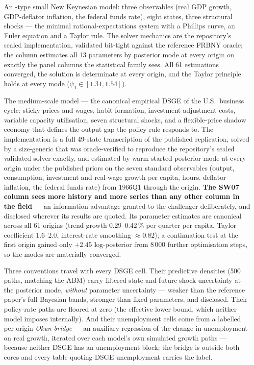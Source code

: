 \documentclass[11pt,a4paper]{article}
\newcommand{\code}[1]{\texttt{\detokenize{#1}}}
\begin{document}
\begin{description}[leftmargin=1.4em,style=nextline,itemsep=3pt]
\item[\code{dsge_small_nk}.] An \citet{anschorfheide2007}-type small New Keynesian model: three
  observables (real GDP growth, GDP-deflator inflation, the federal funds rate), eight states,
  three structural shocks --- the minimal rational-expectations system with a Phillips curve, an
  Euler equation and a Taylor rule. The solver mechanics are the repository's sealed
  implementation, validated bit-tight against the reference FRBNY \code{DSGE.jl} oracle; the
  column estimates all 13 parameters by posterior mode at every origin on exactly the panel
  columns the statistical family sees. All 61 estimations converged, the solution is determinate
  at every origin, and the Taylor principle holds at every mode ($\psi_1 \in [1.31, 1.54]$).
\item[\code{dsge_sw07}.] The \citet{smetswouters2007} medium-scale model --- the canonical
  empirical DSGE of the U.S.\ business cycle: sticky prices and wages, habit formation,
  investment adjustment costs, variable capacity utilisation, seven structural shocks, and a
  flexible-price shadow economy that defines the output gap the policy rule responds to. The
  implementation is a full 49-state transcription of the published replication, solved by a
  size-generic \code{gensys} that was oracle-verified to reproduce the repository's sealed
  validated solver exactly, and estimated by warm-started posterior mode at every origin under
  the published priors on the seven standard observables (output, consumption, investment and
  real-wage growth per capita, hours, deflator inflation, the federal funds rate) from 1966Q1
  through the origin. \textbf{The SW07 column sees more history and more series than any other
  column in the field} --- an information advantage granted to the challenger deliberately, and
  disclosed wherever its results are quoted. Its parameter estimates are canonical across all 61
  origins (trend growth 0.29--0.42\,\% per quarter per capita, Taylor coefficient 1.6--2.0,
  interest-rate smoothing $\approx0.82$); a continuation test at the first origin gained only
  $+2.45$ log-posterior from 8\,000 further optimisation steps, so the modes are materially
  converged.
\end{description}

Three conventions travel with every DSGE cell. Their predictive densities (500 paths, matching
the ABM) carry filtered-state and future-shock uncertainty at the posterior mode, \emph{without}
parameter uncertainty --- weaker than the reference paper's full Bayesian bands, stronger than
fixed parameters, and disclosed. Their policy-rate paths are floored at zero (the effective lower
bound, which neither model imposes internally). And their unemployment cells come from a
labelled per-origin \emph{Okun bridge} --- an auxiliary regression of the change in unemployment
on real growth, iterated over each model's own simulated growth paths --- because neither DSGE
has an unemployment block; the bridge is outside both cores and every table quoting DSGE
unemployment carries the label.
\end{document}
